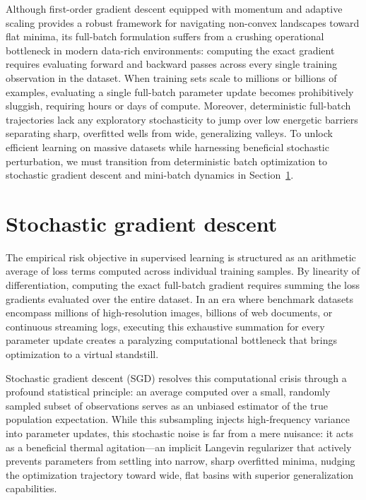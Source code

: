 Although first-order gradient descent equipped with momentum and adaptive scaling provides a robust framework for navigating non-convex landscapes toward flat minima, its full-batch formulation suffers from a crushing operational bottleneck in modern data-rich environments: computing the exact gradient requires evaluating forward and backward passes across every single training observation in the dataset. When training sets scale to millions or billions of examples, evaluating a single full-batch parameter update becomes prohibitively sluggish, requiring hours or days of compute. Moreover, deterministic full-batch trajectories lack any exploratory stochasticity to jump over low energetic barriers separating sharp, overfitted wells from wide, generalizing valleys. To unlock efficient learning on massive datasets while harnessing beneficial stochastic perturbation, we must transition from deterministic batch optimization to stochastic gradient descent and mini-batch dynamics in Section~\ref{sec:sgd_and_minibatch}.

\section{Stochastic gradient descent}
\label{sec:sgd_and_minibatch}

The empirical risk objective in supervised learning is structured as an arithmetic average of loss terms computed across individual training samples. By linearity of differentiation, computing the exact full-batch gradient requires summing the loss gradients evaluated over the entire dataset. In an era where benchmark datasets encompass millions of high-resolution images, billions of web documents, or continuous streaming logs, executing this exhaustive summation for every parameter update creates a paralyzing computational bottleneck that brings optimization to a virtual standstill.

Stochastic gradient descent (SGD) resolves this computational crisis through a profound statistical principle: an average computed over a small, randomly sampled subset of observations serves as an unbiased estimator of the true population expectation. While this subsampling injects high-frequency variance into parameter updates, this stochastic noise is far from a mere nuisance: it acts as a beneficial thermal agitation---an implicit Langevin regularizer that actively prevents parameters from settling into narrow, sharp overfitted minima, nudging the optimization trajectory toward wide, flat basins with superior generalization capabilities.

